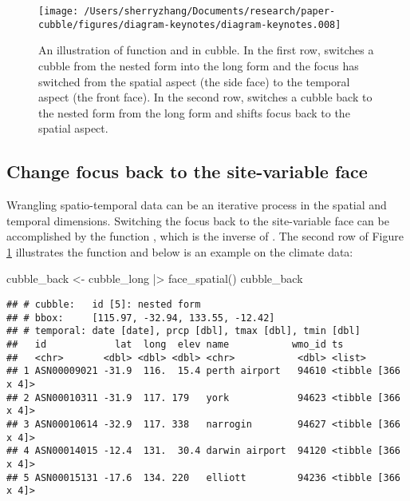 \documentclass{article}
\newenvironment{Shaded}{\begin{snugshade}}{\end{snugshade}}
\newcommand{\FunctionTok}[1]{\textcolor[rgb]{0.00,0.00,0.00}{#1}}
\newcommand{\NormalTok}[1]{#1}
\newcommand{\OtherTok}[1]{\textcolor[rgb]{0.56,0.35,0.01}{#1}}
\newcommand{\SpecialCharTok}[1]{\textcolor[rgb]{0.00,0.00,0.00}{#1}}
\begin{document}
\begin{figure}

{\centering \texttt{[image: /Users/sherryzhang/Documents/research/paper-cubble/figures/diagram-keynotes/diagram-keynotes.008]} 

}

\caption{An illustration of function  and  in cubble. In the first row,  switches a cubble from the nested form into the long form and the focus has switched from the spatial aspect (the side face) to the temporal aspect (the front face). In the second row,  switches a cubble back to the nested form from the long form and shifts focus back to the spatial aspect.}\label{fig:face}
\end{figure}

\hypertarget{change-focus-back-to-the-site-variable-face}{%
\subsection{Change focus back to the site-variable face}\label{change-focus-back-to-the-site-variable-face}}

Wrangling spatio-temporal data can be an iterative process in the spatial and temporal dimensions. Switching the focus back to the site-variable face can be accomplished by the function , which is the inverse of . The second row of Figure \ref{fig:face} illustrates the function and below is an example on the climate data:

\begin{Shaded}
\begin{Highlighting}[]
\NormalTok{cubble\_back }\OtherTok{\textless{}{-}}\NormalTok{ cubble\_long }\SpecialCharTok{|\textgreater{}} \FunctionTok{face\_spatial}\NormalTok{()}
\NormalTok{cubble\_back}
\end{Highlighting}
\end{Shaded}

\begin{verbatim}
## # cubble:   id [5]: nested form
## # bbox:     [115.97, -32.94, 133.55, -12.42]
## # temporal: date [date], prcp [dbl], tmax [dbl], tmin [dbl]
##   id            lat  long  elev name           wmo_id ts                
##   <chr>       <dbl> <dbl> <dbl> <chr>           <dbl> <list>            
## 1 ASN00009021 -31.9  116.  15.4 perth airport   94610 <tibble [366 x 4]>
## 2 ASN00010311 -31.9  117. 179   york            94623 <tibble [366 x 4]>
## 3 ASN00010614 -32.9  117. 338   narrogin        94627 <tibble [366 x 4]>
## 4 ASN00014015 -12.4  131.  30.4 darwin airport  94120 <tibble [366 x 4]>
## 5 ASN00015131 -17.6  134. 220   elliott         94236 <tibble [366 x 4]>
\end{verbatim}
\end{document}
